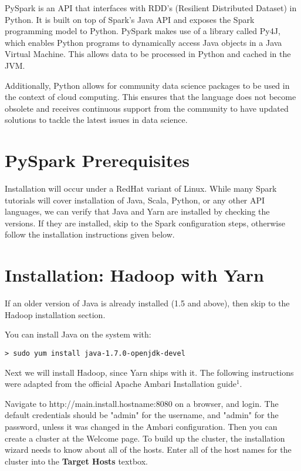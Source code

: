 \documentclass[9pt,twocolumn,twoside]{idsi}
\begin{document}
PySpark is an API that interfaces with RDD's (Resilient Distributed Dataset) in Python. It is built on top of Spark's Java API and exposes the Spark programming model to Python. PySpark makes use of a library called Py4J, which enables Python programs to dynamically access Java objects in a Java Virtual Machine. This allows data to be processed in Python and cached in the JVM.

Additionally, Python allows for community data science packages to be used in the context of cloud computing. This ensures that the language does not become obsolete and receives continuous support from the community to have updated solutions to tackle the latest issues in data science.

\section{PySpark Prerequisites}

Installation will occur under a RedHat variant of Linux. While many Spark tutorials will cover installation of Java, Scala, Python, or any other API languages, we can verify that Java and Yarn are installed by checking the versions. If they are installed, skip to the Spark configuration steps, otherwise follow the installation instructions given below.

\section{Installation: Hadoop with Yarn}
If an older version of Java is already installed (1.5 and above), then skip to the Hadoop installation section.

\noindent
You can install Java on the system with:
\begin{verbatim}
> sudo yum install java-1.7.0-openjdk-devel
\end{verbatim}

\noindent
Next we will install Hadoop, since Yarn ships with it. The following instructions were adapted from the official Apache Ambari Installation guide$^1$.

Navigate to http://{main.install.hostname}:8080 on a browser, and login. The default credentials should be "admin" for the username, and "admin" for the password, unless it was changed in the Ambari configuration.
Then you can create a cluster at the Welcome page. To build up the cluster, the installation wizard needs to know about all of the hosts. Enter all of the host names for the cluster into the \textbf{Target Hosts} textbox.
\end{document}

